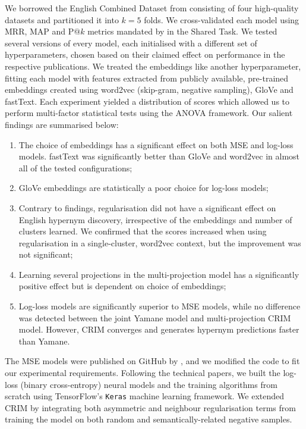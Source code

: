 We borrowed the English Combined Dataset from \citet{ustalov2017negative} consisting of four high-quality datasets and partitioned it into $k=5$ folds.  We cross-validated each model using \ac{MRR}, \ac{MAP} and P$@k$ metrics mandated by \citet{camacho2018semeval} in the Shared Task.  We tested several versions of every model, each initialised with a different set of hyperparameters, chosen based on their claimed effect on performance in the respective publications.  We treated the embeddings like another hyperparameter, fitting each model with features extracted from publicly available, pre-trained embeddings created using word2vec (skip-gram, negative sampling), GloVe and fastText.  Each experiment yielded a distribution of scores which allowed us to perform multi-factor statistical tests using the \ac{ANOVA} framework.  Our salient findings are summarised below:
\begin{enumerate}
    \item The choice of embeddings has a significant effect on both \ac{MSE} and log-loss models.  fastText was significantly better than GloVe and word2vec in almost all of the tested configurations;
    \item GloVe embeddings are statistically a poor choice for log-loss models;
    \item Contrary to \citet{ustalov2017negative} findings, regularisation did not have a significant effect on English hypernym discovery, irrespective of the embeddings and number of clusters learned.  We confirmed that the scores increased when using regularisation in a single-cluster, word2vec context, but the improvement was not significant;
    \item Learning several projections in the multi-projection model has a significantly positive effect but is dependent on choice of embeddings;
    \item Log-loss models are significantly superior to \ac{MSE} models, while no difference was detected between the joint Yamane model and multi-projection CRIM model.  However, CRIM converges and generates hypernym predictions faster than Yamane.
\end{enumerate}

The \ac{MSE} models were published on GitHub by \citeauthor{ustalov2017negative}, and we modified the code to fit our experimental requirements.  Following the technical papers, we built the log-loss (binary cross-entropy) neural models and the training algorithms from scratch using TensorFlow's \texttt{Keras} machine learning framework.  We extended CRIM by integrating both asymmetric and neighbour regularisation terms from \citet{ustalov2017negative} training the model on both random and semantically-related negative samples. 

